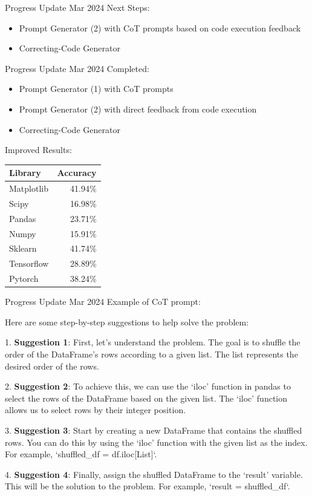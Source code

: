 \begin{frame}{Progress Update  Mar 2024}
    Next Steps:
    \begin{itemize}
        \item Prompt Generator (2) with CoT prompts based on code execution feedback
        \item Correcting-Code Generator
    \end{itemize}
\end{frame}

\begin{frame}{Progress Update  Mar 2024}
    Completed:
    \begin{itemize}
        \item Prompt Generator (1) with CoT prompts
        \item Prompt Generator (2) with direct feedback from code execution
        \item Correcting-Code Generator
    \end{itemize}

    Improved Results:
    \begin{tabular}{lr}
        Library    & Accuracy \\
        \hline
        Matplotlib & 41.94\%  \\
        Scipy      & 16.98\%  \\
        Pandas     & 23.71\%  \\
        Numpy      & 15.91\%  \\
        Sklearn    & 41.74\%  \\
        Tensorflow & 28.89\%  \\
        Pytorch    & 38.24\%  \\
    \end{tabular}
\end{frame}

\begin{frame}{Progress Update  Mar 2024}
    Example of CoT prompt:

    Here are some step-by-step suggestions to help solve the problem:

    1. \textbf{Suggestion 1}: First, let's understand the problem. The goal is to shuffle the order of the DataFrame's rows according to a given list. The list represents the desired order of the rows.

    2. \textbf{Suggestion 2}: To achieve this, we can use the `iloc' function in pandas to select the rows of the DataFrame based on the given list. The `iloc' function allows us to select rows by their integer position.

    3. \textbf{Suggestion 3}: Start by creating a new DataFrame that contains the shuffled rows. You can do this by using the `iloc' function with the given list as the index. For example, `shuffled\_df = df.iloc[List]`.

    4. \textbf{Suggestion 4}: Finally, assign the shuffled DataFrame to the `result' variable. This will be the solution to the problem. For example, `result = shuffled\_df`.
\end{frame}

